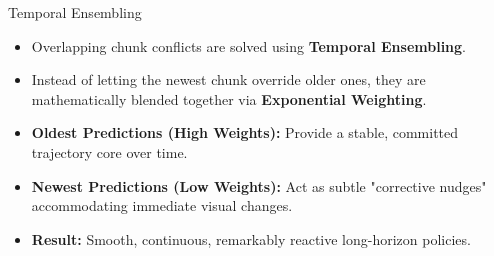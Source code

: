 \documentclass[11pt, aspectratio=169]{beamer}
\begin{document}
\begin{frame}{Temporal Ensembling}
    \begin{itemize}
        \item Overlapping chunk conflicts are solved using \textbf{Temporal Ensembling}.
        \item Instead of letting the newest chunk override older ones, they are mathematically blended together via \textbf{Exponential Weighting}.
        \item \textbf{Oldest Predictions (High Weights):} Provide a stable, committed trajectory core over time.
        \item \textbf{Newest Predictions (Low Weights):} Act as subtle "corrective nudges" accommodating immediate visual changes.
        \item \textbf{Result:} Smooth, continuous, remarkably reactive long-horizon policies.
    \end{itemize}
\end{frame}
\end{document}

